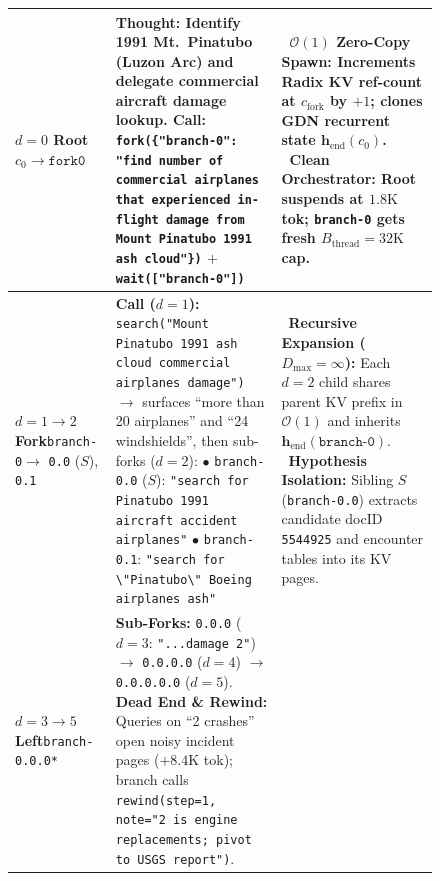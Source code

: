 \documentclass{article}
\newcommand{\tstrut}{\rule{0pt}{3.55ex}}
\newcommand{\bstrut}{\rule[-2.15ex]{0pt}{0pt}}
\newcommand{\cmarkyes}{\textcolor{ourstext}{\ding{51}}}
\begin{document}
\begin{figure}[!t]
{\begin{tabular}{L{2.45cm} L{8.15cm} L{7.90cm}}
\tstrut\textbf{$d=0$ Root}\newline$c_0 \to \texttt{fork0}$\bstrut &
\tstrut\textbf{Thought:} Identify 1991 Mt.\ Pinatubo (Luzon Arc) and delegate commercial aircraft damage lookup.\newline
\textbf{Call:} \texttt{fork(\{"branch-0": "find number of commercial airplanes that experienced in-flight damage from Mount Pinatubo 1991 ash cloud"\})} $+$ \texttt{wait(["branch-0"])}\bstrut &
\tstrut\cmarkyes~\textbf{$\mathcal{O}(1)$ Zero-Copy Spawn:} Increments Radix KV ref-count at $c_{\text{fork}}$ by $+1$; clones GDN recurrent state $\mathbf{h}_{\text{end}}(c_0)$.\newline
\cmarkyes~\textbf{Clean Orchestrator:} Root suspends at $1.8\text{K}$ tok; \texttt{branch-0} gets fresh $B_{\text{thread}} = 32\text{K}$ cap.\bstrut \\
\midrule
\tstrut\textbf{$d=1 \to 2$ Fork}\newline\texttt{branch-0}\newline$\to$ \texttt{0.0} ($S$), \texttt{0.1}\bstrut &
\tstrut\textbf{Call ($d=1$):} \texttt{search("Mount Pinatubo 1991 ash cloud commercial airplanes damage")} $\to$ surfaces ``more than 20 airplanes'' and ``24 windshields'', then sub-forks ($d=2$):\newline
$\bullet$ \texttt{branch-0.0} ($S$): \texttt{"search for Pinatubo 1991 aircraft accident airplanes"}\newline
$\bullet$ \texttt{branch-0.1}: \texttt{"search for \textbackslash"Pinatubo\textbackslash" Boeing airplanes ash"}\bstrut &
\tstrut\cmarkyes~\textbf{Recursive Expansion ($D_{\max}=\infty$):} Each $d=2$ child shares parent KV prefix in $\mathcal{O}(1)$ and inherits $\mathbf{h}_{\text{end}}(\texttt{branch-0})$.\newline
\cmarkyes~\textbf{Hypothesis Isolation:} Sibling $S$ (\texttt{branch-0.0}) extracts candidate docID \texttt{5544925} and encounter tables into its KV pages.\bstrut \\
\midrule
{}
\tstrut\textbf{$d=3 \to 5$ Left}\newline\texttt{branch-0.0.0*}\bstrut &
\tstrut\textbf{Sub-Forks:} \texttt{0.0.0} ($d=3$: \texttt{"...damage 2"}) $\to$ \texttt{0.0.0.0} ($d=4$) $\to$ \texttt{0.0.0.0.0} ($d=5$).\newline
\textbf{Dead End \& Rewind:} Queries on ``2 crashes'' open noisy incident pages ($+8.4\text{K}$ tok); branch calls \texttt{rewind(step=1, note="2 is engine replacements; pivot to USGS report")}.\bstrut &

\end{tabular}}
\end{figure}
\end{document}
